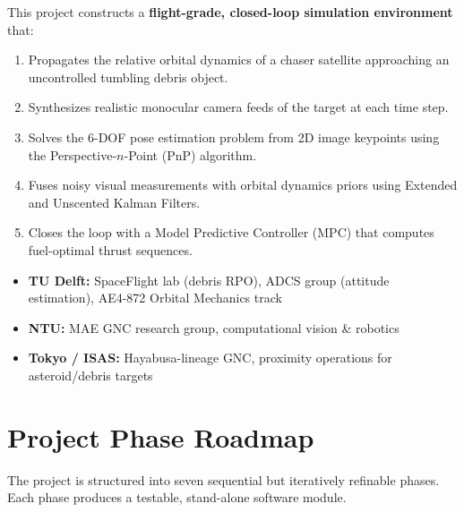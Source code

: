 \documentclass[12pt, a4paper]{article}
\begin{document}
This project constructs a \textbf{flight-grade, closed-loop simulation
environment} that:
\begin{enumerate}[leftmargin=2em]
    \item Propagates the relative orbital dynamics of a chaser satellite
          approaching an uncontrolled tumbling debris object.
    \item Synthesizes realistic monocular camera feeds of the target at each
          time step.
    \item Solves the 6-DOF pose estimation problem from 2D image keypoints
          using the Perspective-$n$-Point (PnP) algorithm.
    \item Fuses noisy visual measurements with orbital dynamics priors using
          Extended and Unscented Kalman Filters.
    \item Closes the loop with a Model Predictive Controller (MPC) that
          computes fuel-optimal thrust sequences.
\end{enumerate}

\begin{assetbox}[title=Key Research Connections]
\begin{itemize}[leftmargin=1.5em, itemsep=2pt]
    \item \textbf{TU Delft:} SpaceFlight lab (debris RPO), ADCS group (attitude
          estimation), AE4-872 Orbital Mechanics track
    \item \textbf{NTU:} MAE GNC research group, computational vision \& robotics
    \item \textbf{Tokyo / ISAS:} Hayabusa-lineage GNC, proximity operations
          for asteroid/debris targets
\end{itemize}
\end{assetbox}

\section{Project Phase Roadmap}

The project is structured into seven sequential but iteratively refinable phases.
Each phase produces a testable, stand-alone software module.
\end{document}
